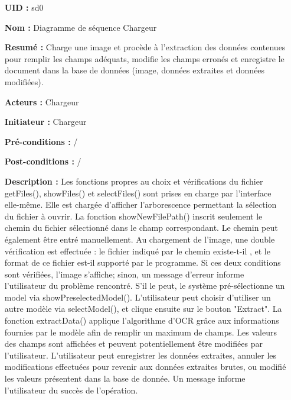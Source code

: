\begin{itemize}
	\item[{\bf UID :}] sd0
	\item[{\bf Nom :}] Diagramme de séquence Chargeur
	\item[{\bf Resumé :}]  Charge une image et procède à l'extraction des données contenues pour remplir les champs adéquats, modifie les champs erronés et enregistre le document dans la base de données (image, données extraites et données modifiées).
	\item[{\bf Acteurs :}] Chargeur
	\item[{\bf Initiateur :}] Chargeur
	\item[{\bf Pré-conditions :}]  /
	\item[{\bf Post-conditions :}]  /
\smallbreak
	\item[{\bf Description :}]
	Les fonctions propres au choix et vérifications du fichier getFiles(), showFiles() et selectFiles() sont prises en charge par l'interface elle-même. Elle est chargée d'afficher l'arborescence permettant la sélection du fichier à ouvrir. La fonction showNewFilePath() inscrit seulement le chemin du fichier sélectionné dans le champ correspondant. Le chemin peut également être entré manuellement.
	\medbreak
	Au chargement de l'image, une double vérification est effectuée : le fichier indiqué par le chemin existe-t-il , et le format de ce fichier est-il supporté par le programme. Si ces deux conditions sont vérifiées, l'image s'affiche; sinon, un message d'erreur informe l'utilisateur du problème rencontré.
	\medbreak
	S'il le peut, le système pré-sélectionne un model via showPreselectedModel().
	L'utilisateur peut choisir d'utiliser un autre modèle via selectModel(), et clique ensuite sur le bouton "Extract".
	\medbreak
	La fonction extractData() applique l'algorithme d'OCR grâce aux informations fournies par le modèle afin de remplir un maximum de champs. Les valeurs des champs sont affichées et peuvent potentiellement être modifiées par l'utilisateur.
	\medbreak
	L'utilisateur peut enregistrer les données extraites, annuler les modifications effectuées pour revenir aux données extraites brutes, ou modifié les valeurs présentent dans la base de donnée. Un message informe l'utilisateur du succès de l'opération.
\end{itemize}

